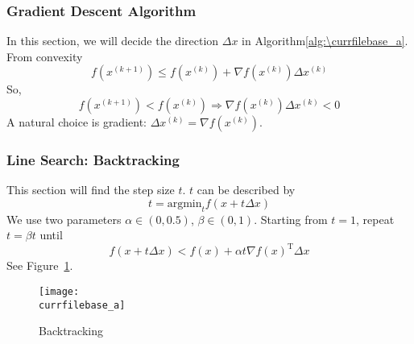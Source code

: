 \documentclass[catalog.tex]{subfiles}
\begin{document}
\subsubsection{Gradient Descent Algorithm}
In this section, we will decide the direction $\Delta x$ in Algorithm\ref{alg:\currfilebase_a}. From convexity
\begin{equation}
f\left(x^{(k+1)}\right) \leq f\left(x^{(k)}\right) + \nabla f\left(x^{(k)}\right)\Delta x^{(k)}
\end{equation}
So, 
\begin{equation}
f\left(x^{(k+1)}\right) < f\left(x^{(k)}\right) \Rightarrow \nabla f\left(x^{(k)}\right)\Delta x^{(k)} < 0
\end{equation}
A natural choice is gradient: $\Delta x^{(k)} = \nabla f\left(x^{(k)}\right)$.
\subsubsection{Line Search: Backtracking}
This section will find the step size $t$. $t$ can be described by
\begin{equation}
t = \text{argmin}_t f(x+t\Delta x)
\end{equation}
We use two parameters $\alpha\in (0, 0.5)$, $\beta \in (0,1)$. Starting from $t=1$, repeat $t = \beta t$ until
\begin{equation}
f(x+t\Delta x) < f(x) + \alpha t \nabla f(x)^{\mathrm{T}}\Delta x
\end{equation}
See Figure~\ref{fig:\currfilebase_a}.
\begin{figure}[!htb]
\centering
\texttt{[image: \\currfilebase\_a]}
	\caption{Backtracking}
	\label{fig:\currfilebase_a}
\end{figure}
\end{document}
